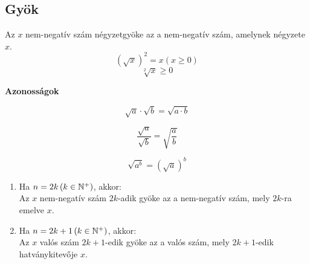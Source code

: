 
\newpage
\subsection{Gyök}

 {
	Az $x$ nem-negatív szám négyzetgyöke az a nem-negatív szám, amelynek négyzete $x$.
	$$\left(\sqrt{x}\right)^2 = x (x\geq 0)$$
	$$\sqrt[2]{x}\geq 0$$
}

\begin{tcolorbox}
	\begin{center}
		\bf\huge{Azonosságok}
	\end{center}
	\begin{minipage}{0.49\textwidth}
		\begin{tcolorbox}[width=\textwidth,center]
			$$\sqrt{a}\cdot\sqrt{b}=\sqrt{a\cdot b}$$
		\end{tcolorbox}
	\end{minipage}
	\hfill
	\begin{minipage}{0.49\textwidth}
		\begin{tcolorbox}[width=\textwidth,center]
			$$\frac{\sqrt{a}}{\sqrt{b}} = \sqrt{\frac{a}{b}}$$
		\end{tcolorbox}
	\end{minipage}
	\begin{tcolorbox}[width=0.5\textwidth,center]$$\sqrt{a^b} = \left(\sqrt{a}\right)^b$$ \end{tcolorbox}
\end{tcolorbox}

 {
	\begin{enumerate}[label=\bfseries\tiny\protect\circled{\small\arabic*}]
		\item Ha $n=2k\left(k\in\NN^+\right)$, akkor:\\
			Az $x$ nem-negatív szám $2k$-adik gyöke az a nem-negatív szám, mely $2k$-ra emelve $x$.
		\item Ha $n=2k+1\left(k\in\NN^+\right)$, akkor:\\
			Az $x$ valós szám $2k+1$-edik gyöke az a valós szám, mely $2k+1$-edik hatványkitevője $x$.
	\end{enumerate}
}


